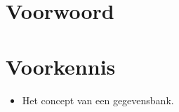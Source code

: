 \documentclass[transacties.tex]{subfiles}
\begin{document}
\section*{Voorwoord}

\section*{Voorkennis}
\begin{itemize}
\item Het concept van een gegevensbank.
\end{itemize}
\end{document}
